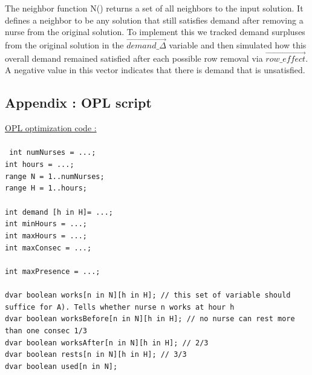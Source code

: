 \documentclass[11pt]{article}
\begin{document}
{The neighbor function N() returns a set of all neighbors to the input solution. 
It defines a neighbor to be any solution that still satisfies demand after removing a nurse from the original solution.
To implement this we tracked demand surpluses from the original solution in the $\vec{demand\_\Delta}$ variable and then
simulated how this overall demand remained satisfied after each possible row removal via $\vec{row\_effect}$. A
negative value in this vector indicates that there is demand that is unsatisfied.


\pagebreak
\begin{appendix}

\section{Appendix  : OPL script }
\label{appenOPL}
\underline{OPL optimization code :}\\\\
{\tt
int numNurses = ...;\\
int hours = ...;\\
range N = 1..numNurses;\\
range H = 1..hours;\\
\\
int demand [h in H]= ...;\\
int minHours = ...;\\
int maxHours = ...;\\
int maxConsec = ...;\\
\\
int maxPresence = ...;\\
\\
dvar boolean works[n in N][h in H]; // this set of variable should suffice for A). Tells whether nurse n works at hour h\\
dvar boolean worksBefore[n in N][h in H]; // no nurse can rest more than one consec 1/3\\
dvar boolean worksAfter[n in N][h in H]; // 2/3\\
dvar boolean rests[n in N][h in H]; // 3/3\\
dvar boolean used[n in N];\\
\\\\

}
\end{appendix}}
\end{document}
